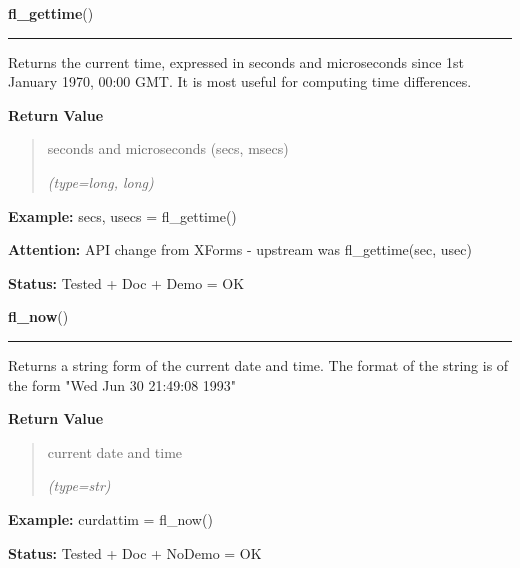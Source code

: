 \hspace{.8\funcindent}\begin{boxedminipage}{\funcwidth}

    \raggedright \textbf{fl\_gettime}()

    \vspace{-1.5ex}

    \rule{\textwidth}{0.5\fboxrule}
\setlength{\parskip}{2ex}
    Returns the current time, expressed in seconds and microseconds since 
    1st January 1970, 00:00 GMT. It is most useful for computing time 
    differences.

\setlength{\parskip}{1ex}
      \textbf{Return Value}
    \vspace{-1ex}

      \begin{quote}
      seconds and microseconds (secs, msecs)

      {\it (type=long, long)}

      \end{quote}

\textbf{Example:} secs, usecs = fl\_gettime()



\textbf{Attention:} API change from XForms - upstream was fl\_gettime(sec, usec)



\textbf{Status:} Tested + Doc + Demo = OK



    \end{boxedminipage}

    \label{xformslib:flbasic:fl_now}

    \vspace{0.5ex}

\hspace{.8\funcindent}\begin{boxedminipage}{\funcwidth}

    \raggedright \textbf{fl\_now}()

    \vspace{-1.5ex}

    \rule{\textwidth}{0.5\fboxrule}
\setlength{\parskip}{2ex}
    Returns a string form of the current date and time. The format of the 
    string is of the form "Wed Jun 30 21:49:08 1993"

\setlength{\parskip}{1ex}
      \textbf{Return Value}
    \vspace{-1ex}

      \begin{quote}
      current date and time

      {\it (type=str)}

      \end{quote}

\textbf{Example:} curdattim = fl\_now()



\textbf{Status:} Tested + Doc + NoDemo = OK



    \end{boxedminipage}

